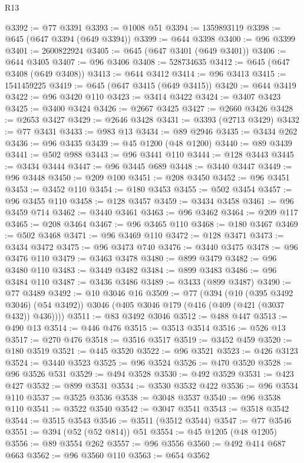 \begin{lexlean}{R13}
\begin{coremodule}
{{{{{{{{{{{{{{{{{{{{{{{{{{{{{{{{{{{{{{{{{{{{{{{{{{{{{{{{{{{{{{{{{{{{{{{{{{{{{{{{{{{{{{{{{{{{{{{{{{{{{{{{{{@3392 := @77 @3391
@3393 := @1008 @51
@3394 := 1359893119
@3398 := @645 (@647 @3394 (@649 @3394))
@3399 := @644 @3398
@3400 := @96 @3399
@3401 := 2600822924
@3405 := @645 (@647 @3401 (@649 @3401))
@3406 := @644 @3405
@3407 := @96 @3406
@3408 := 528734635
@3412 := @645 (@647 @3408 (@649 @3408))
@3413 := @644 @3412
@3414 := @96 @3413
@3415 := 1541459225
@3419 := @645 (@647 @3415 (@649 @3415))
@3420 := @644 @3419
@3422 := @96 @3420 @110
@3423 := @3414 @3422
@3424 := @3407 @3423
@3425 := @3400 @3424
@3426 := @2667 @3425
@3427 := @2660 @3426
@3428 := @2653 @3427
@3429 := @2646 @3428
@3431 := @3393 (@2713 @3429)
@3432 := @77 @3431
@3433 := @983 @13
@3434 := @89 @2946
@3435 := @3434 @262
@3436 := @96 @3435
@3439 := @45 @1200 (@48 @1200)
@3440 := @89 @3439
@3441 := @502 @988
@3443 := @96 @3441 @110
@3444 := @128 @3443
@3445 := @3434 @3444
@3447 := @96 @3445 @689
@3448 := @3440 @3447
@3449 := @96 @3448
@3450 := @209 @100
@3451 := @208 @3450
@3452 := @96 @3451
@3453 := @3452 @110
@3454 := @180 @3453
@3455 := @502 @3454
@3457 := @96 @3455 @110
@3458 := @128 @3457
@3459 := @3434 @3458
@3461 := @96 @3459 @714
@3462 := @3440 @3461
@3463 := @96 @3462
@3464 := @209 @117
@3465 := @208 @3464
@3467 := @96 @3465 @110
@3468 := @180 @3467
@3469 := @502 @3468
@3471 := @96 @3469 @110
@3472 := @128 @3471
@3473 := @3434 @3472
@3475 := @96 @3473 @740
@3476 := @3440 @3475
@3478 := @96 @3476 @110
@3479 := @3463 @3478
@3480 := @899 @3479
@3482 := @96 @3480 @110
@3483 := @3449 @3482
@3484 := @899 @3483
@3486 := @96 @3484 @110
@3487 := @3436 @3486
@3489 := @3433 (@899 @3487)
@3490 := @77 @3489
@3492 := @10 @3046 @16
@3509 := @77
    (@394
      (@10 (@395 @3492 @3046) (@54 @3492))
      @3046
      (@405 @3046 @179 (@416 (@409 (@421 (@3037 @432)) @436))))
@3511 := @83 @3492 @3046
@3512 := @488 @447
@3513 := @490 @13
@3514 := @446 @476
@3515 := @3513 @3514
@3516 := @526 @13
@3517 := @270 @476
@3518 := @3516 @3517
@3519 := @3452 @459
@3520 := @180 @3519
@3521 := @445 @3520
@3522 := @96 @3521
@3523 := @426 @3123
@3524 := @3440 @3523
@3525 := @96 @3524
@3526 := @470 @3520
@3528 := @96 @3526 @531
@3529 := @494 @3528
@3530 := @492 @3529
@3531 := @423 @427
@3532 := @899 @3531
@3534 := @3530 @3532 @422
@3536 := @96 @3534 @110
@3537 := @3525 @3536
@3538 := @3048 @3537
@3540 := @96 @3538 @110
@3541 := @3522 @3540
@3542 := @3047 @3541
@3543 := @3518 @3542
@3544 := @3515 @3543
@3546 := @3511 (@3512 @3544)
@3547 := @77 @3546
@3551 := @394 (@52 (@52 @814)) @51
@3554 := @45 @1205 (@48 @1205)
@3556 := @89 @3554 @262
@3557 := @96 @3556
@3560 := @492 @414 @687 @663
@3562 := @96 @3560 @110
@3563 := @654 @3562
}}}}}}}}}}}}}}}}}}}}}}}}}}}}}}}}}}}}}}}}}}}}}}}}}}}}}}}}}}}}}}}}}}}}}}}}}}}}}}}}}}}}}}}}}}}}}}}}}}}}}}}}}}
\end{coremodule}
\end{lexlean}

